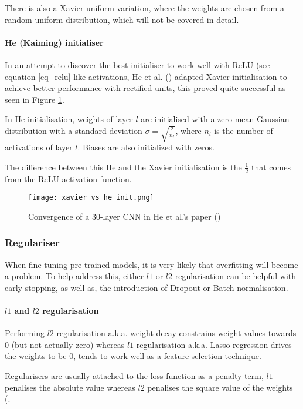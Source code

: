 There is also a Xavier uniform variation, where the weights are chosen from a random uniform distribution, which will not be covered in detail.
\paragraph{He (Kaiming) initialiser} In an attempt to discover the best initialiser to work well with \gls{ReLU} (see equation \ref{eq_relu} like activations, He et al. (\cite{He_2015_ICCV}) adapted Xavier initialisation to achieve better performance with rectified units, this proved quite successful as seen in Figure \ref{fig_he_xavier}.

In He initialisation, weights of layer $l$ are initialised with a zero-mean Gaussian distribution with a standard deviation $\sigma =\sqrt{\frac{2}{n_l}}$, where $n_l$ is the number of activations of layer $l$. Biases are also initialized with zeros. 

The difference between this He and the Xavier initialisation is the $\frac{1}{2}$ that comes from the \gls{ReLU} activation function.


\begin{figure}[hbt!]
    \centering
    \texttt{[image: xavier vs he init.png]}
    \caption{Convergence of a 30-layer \gls{CNN} in He et al.'s paper (\cite{He_2015_ICCV})}
    \label{fig_he_xavier}
\end{figure}
\subsubsection{Regulariser} \label{regulariser}
When fine-tuning pre-trained models, it is very likely that overfitting will become a problem. To help address this, either $l1$ or $l2$ regularisation can be helpful with early stopping, as well as, the introduction of Dropout or Batch normalisation.
\paragraph{$l1$ and $l2$ regularisation}
Performing $l2$ regularisation \gls{a.k.a.} weight decay constrains weight values towards 0 (but not actually zero) whereas $l1$ regularisation \gls{a.k.a.} Lasso regression drives the weights to be $0$, tends to work well as a feature selection technique. 

Regularisers are usually attached to the loss function as a penalty term, $l1$ penalises the absolute value whereas $l2$ penalises the square value of the weights (\cite{shanmugamani2018deep}. 

